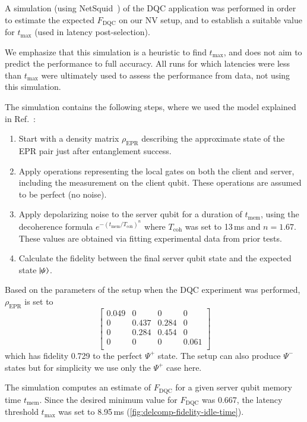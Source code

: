 A simulation (using NetSquid~\cite{coopmans_2021_netsquid}) of the \ac{DQC} application was performed in order to estimate the expected $F_{\text{DQC}}$ on our \ac{NV} setup, and to establish a suitable value for $t_{\max}$ (used in latency post-selection).

We emphasize that this simulation is a heuristic to find $t_{\max}$, and does not aim to predict the performance to full accuracy. All runs for which latencies were less than $t_{\max}$ were ultimately used to assess the performance from data, not using this simulation.

The simulation contains the following steps, where we 
used the model explained in Ref.~\cite{pompili_2021_multinode}:
%
\begin{enumerate}
    \item Start with a density matrix $\rho_{\text{EPR}}$ describing the approximate state of the \ac{EPR} pair just after entanglement success.
    \item Apply operations representing the local gates on both the client and server, including the measurement on the client qubit. These operations are assumed to be perfect (no noise).
    \item Apply depolarizing noise to the server qubit for a duration of $t_{\text{mem}}$, using the decoherence formula $e^{-\left(t_{\text{mem}}/T_{\text{coh}}\right)^n}$ where $T_{\text{coh}}$ was set to 13\,ms and $n=1.67$. These values are obtained via fitting experimental data from prior tests.
    \item Calculate the fidelity between the final server qubit state and the expected state $\ket{\psi}$.
\end{enumerate}

Based on the parameters of the setup when the \ac{DQC} experiment was performed, $\rho_{\text{EPR}}$ is set to
%
\[
\begin{bmatrix}
0.049 & 0 & 0 & 0 \\
0 & 0.437 & 0.284 & 0 \\
0 & 0.284 & 0.454 & 0 \\
0 & 0 & 0 & 0.061 \\
\end{bmatrix}
\]
%
which has fidelity 0.729 to the perfect $\Psi^+$ state. The setup can also produce $\Psi^-$ states but for simplicity we use only the $\Psi^+$ case here. 

The simulation computes an estimate of $F_{\text{DQC}}$ for a given server qubit memory time $t_{\text{mem}}$. Since the desired minimum value for $F_{\text{DQC}}$ was 0.667, the latency threshold $t_{\max}$ was set to 8.95\,ms (\cref{fig:delcomp-fidelity-idle-time}).


